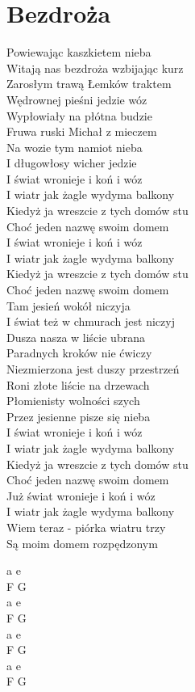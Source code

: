 \section{Bezdroża}
\noindent
\begin{minipage}{\dimexpr.4\textwidth-.4\columnsep}
    Powiewając kaszkietem nieba\\
    Witają nas bezdroża wzbijając kurz\\
    Zarosłym trawą Łemków traktem\\
    Wędrownej pieśni jedzie wóz\\
    \hfill\break
    Wypłowiały na płótna budzie\\
    Fruwa ruski Michał z mieczem\\
    Na wozie tym namiot nieba\\
    I długowłosy wicher jedzie\\
    \hfill\break
    I świat wronieje i koń i wóz\\
    I wiatr jak żagle wydyma balkony\\
    Kiedyż ja wreszcie z tych domów stu\\
    Choć jeden nazwę swoim domem\\
    \hfill\break
    I świat wronieje i koń i wóz\\
    I wiatr jak żagle wydyma balkony\\
    Kiedyż ja wreszcie z tych domów stu\\
    Choć jeden nazwę swoim domem\\
    \hfill\break
    Tam jesień wokół niczyja\\
    I świat też w chmurach jest niczyj\\
    Dusza nasza w liście ubrana\\
    Paradnych kroków nie ćwiczy\\
    \hfill\break
    Niezmierzona jest duszy przestrzeń\\
    Roni złote liście na drzewach\\
    Płomienisty wolności szych\\
    Przez jesienne pisze się nieba\\
    \hfill\break
    I świat wronieje i koń i wóz\\
    I wiatr jak żagle wydyma balkony\\
    Kiedyż ja wreszcie z tych domów stu\\
    Choć jeden nazwę swoim domem\\
    \hfill\break
    Już świat wronieje i koń i wóz\\
    I wiatr jak żagle wydyma balkony\\
    Wiem teraz - piórka wiatru trzy\\
    Są moim domem rozpędzonym\\
\end{minipage}
\hfill
\begin{minipage}{\dimexpr.05\textwidth-.05\columnsep}
    \ifchorded
    a e\\
    F G\\
    a e\\
    F G\\
    \hfill\break
    a e\\
    F G\\
    a e\\
    F G\\
    \else
    \fi
\end{minipage}